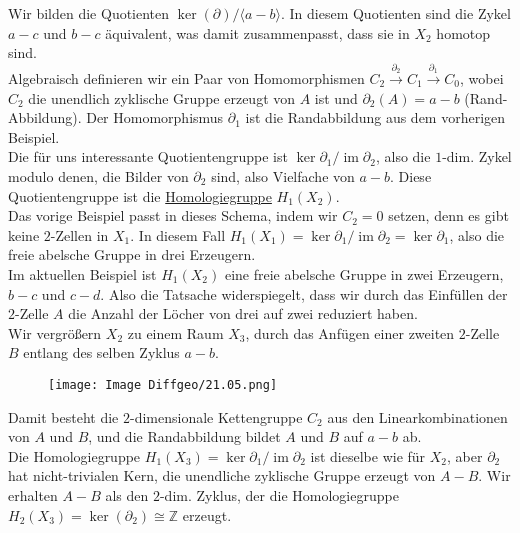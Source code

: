 \documentclass[fleqn, 12pt, letterpaper]{article}
\begin{document}
Wir bilden die Quotienten \(\ker(\partial)/\langle a - b \rangle\). In diesem Quotienten sind die Zykel \(a - c\) und \(b - c\) äquivalent, was damit zusammenpasst, dass sie in \(X_2\) homotop sind.\\

Algebraisch definieren wir ein Paar von Homomorphismen \(C_2 \xrightarrow{\partial_2} C_1 \xrightarrow{\partial_1} C_0
\), wobei \(C_2\) die unendlich zyklische Gruppe erzeugt von \(A\) ist und \(\partial_2(A) = a - b\) (Rand-Abbildung). Der Homomorphismus \(\partial_1\) ist die Randabbildung aus dem vorherigen Beispiel.\\

Die für uns interessante Quotientengruppe ist \( \ker \partial_1 / \operatorname{im} \partial_2 \), also die \(1\)-dim. Zykel modulo denen, die Bilder von \(\partial_2\) sind, also Vielfache von \(a - b\). Diese Quotientengruppe ist die \underline{Homologiegruppe} \(H_1(X_2)\).\\

Das vorige Beispiel passt in dieses Schema, indem wir \(C_2 = 0\) setzen, denn es gibt keine \(2\)-Zellen in \(X_1\).  
In diesem Fall \(H_1(X_1) = \ker \partial_1 / \operatorname{im} \partial_2  = \ker\partial_1\), also die freie abelsche Gruppe in drei Erzeugern.\\

Im aktuellen Beispiel ist \(H_1(X_2)\) eine freie abelsche Gruppe in zwei Erzeugern, \(b - c\) und \(c - d\). Also die Tatsache widerspiegelt, dass wir durch das Einfüllen der \(2\)-Zelle \(A\) die Anzahl der Löcher von drei auf zwei reduziert haben.\\

Wir vergrößern \(X_2\) zu einem Raum \(X_3\), durch das Anfügen einer zweiten \(2\)-Zelle \(B\) entlang des selben Zyklus \(a - b\).

\begin{figure}[H]
    \centering
    \texttt{[image: Image Diffgeo/21.05.png]}

 \end{figure}

Damit besteht die \(2\)-dimensionale Kettengruppe \(C_2\) aus den Linearkombinationen von \(A\) und \(B\), und die Randabbildung bildet \(A\) und \(B\) auf \(a - b\) ab.\\

Die Homologiegruppe \(H_1(X_3)=\ker \partial_1 / \operatorname{im} \partial_2  \) ist dieselbe wie für \(X_2\), aber \(\partial_2\) hat nicht-trivialen Kern, die unendliche zyklische Gruppe erzeugt von \(A - B\). Wir erhalten \(A - B\) als den \(2\)-dim. Zyklus, der die Homologiegruppe \(H_2(X_3) = \ker(\partial_2) \cong \mathbb{Z}\) erzeugt.\\
\end{document}
